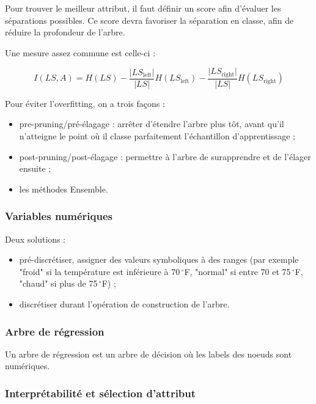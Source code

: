 	Pour trouver le meilleur attribut, il faut définir un score afin d'évaluer les séparations possibles. Ce score devra favoriser la séparation en classe, afin de réduire la profondeur de l'arbre.
	
	
	Une mesure assez commune est celle-ci :
	
	$$I(LS, A) = H(LS) - \frac{\vert LS_{\text{left}}\vert}{\vert LS\vert}H(LS_{\text{left}}) - \frac{\vert LS_{\text{right}}\vert}{\vert LS \vert}H(LS_{\text{right}})$$
	
	
	Pour éviter l'overfitting, on a trois façons :
	
	\begin{itemize}
		\item pre-pruning/pré-élagage : arrêter d'étendre l'arbre plus tôt, avant qu'il n'atteigne le point où il classe parfaitement l'échantillon d'apprentissage ;
		\item post-pruning/post-élagage : permettre à l'arbre de surapprendre et de l'élager ensuite ;
		\item les méthodes Ensemble.
	\end{itemize}
	
	
	\subsubsection{Variables numériques}
	
	Deux solutions :
	\begin{itemize}
		\item pré-discrétiser, assigner des valeurs symboliques à des ranges (par exemple "froid" si la température est inférieure à 70$\,^{\circ}$F, "normal" si entre 70 et 75$\,^{\circ}$F, "chaud" si plus de 75$\,^{\circ}$F) ;
		\item discrétiser durant l'opération de construction de l'arbre.
		
	\end{itemize}
	
	\subsubsection{Arbre de régression}
	
	Un arbre de régression est un arbre de décision où les labels des noeuds sont numériques.
	
	\subsubsection{Interprétabilité et sélection d'attribut}
	
